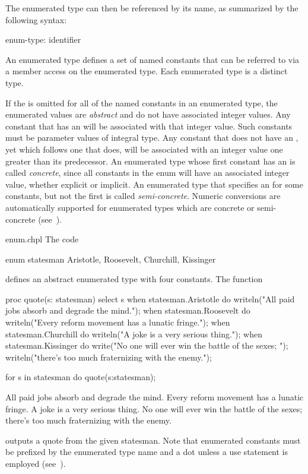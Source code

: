 The enumerated type can then be referenced by its name, as summarized
by the following syntax:

\begin{syntax}
enum-type:
  identifier
\end{syntax}

An enumerated type defines a set of named constants that can be
referred to via a member access on the enumerated type.
Each enumerated type is a distinct type.

If the  is omitted for all of the named constants in
an enumerated type, the enumerated values are \emph{abstract} and do
not have associated integer values.  Any constant that has an
 will be associated with that integer value.  Such
constants must be parameter values of integral type.  Any constant
that does not have an , yet which follows one that
does, will be associated with an integer value one greater than its
predecessor.  An enumerated type whose first constant has
an  is called \emph{concrete}, since all constants in
the enum will have an associated integer value, whether explicit or
implicit.  An enumerated type that specifies an  for
some constants, but not the first is called \emph{semi-concrete}.
Numeric conversions are automatically supported for enumerated types
which are concrete or semi-concrete
(see~).

\begin{chapelexample}{enum.chpl}
The code
\begin{chapel}
enum statesman { Aristotle, Roosevelt, Churchill, Kissinger }
\end{chapel}
defines an abstract enumerated type with four constants.  The function
\begin{chapel}
proc quote(s: statesman) {
  select s {
    when statesman.Aristotle do
       writeln("All paid jobs absorb and degrade the mind.");
    when statesman.Roosevelt do
       writeln("Every reform movement has a lunatic fringe.");
    when statesman.Churchill do
       writeln("A joke is a very serious thing.");
    when statesman.Kissinger do
       { write("No one will ever win the battle of the sexes; ");
         writeln("there's too much fraternizing with the enemy."); }
  }
}
\end{chapel}
\begin{chapelnoprint}
for s in statesman do
  quote(s:statesman);
\end{chapelnoprint}
\begin{chapeloutput}
All paid jobs absorb and degrade the mind.
Every reform movement has a lunatic fringe.
A joke is a very serious thing.
No one will ever win the battle of the sexes; there's too much fraternizing with the enemy.
\end{chapeloutput}
outputs a quote from the given statesman.  Note that enumerated
constants must be prefixed by the enumerated type name and a dot unless a
use statement is employed (see~).
\end{chapelexample}

